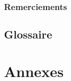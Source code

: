\documentclass{main}
\begin{document}
\makeatletter
\patchcmd{\ttlh@hang}{\parindent\z@}{\parindent\z@\leavevmode}{}{}
\patchcmd{\ttlh@hang}{\noindent}{}{}{}
\makeatother



\renewcommand{\baselinestretch}{1.0}\normalsize
\newcommand{\itab}[1]{\hspace{0em}\rlap{#1}}
\newcommand{\tab}[1]{\hspace{.2\textwidth}\rlap{#1}}
\renewcommand{\bibname}{Bibliographie} %


\cleardoublepage


\section*{Remerciements} %

\cleardoublepage

\renewcommand{\baselinestretch}{0.5}\normalsize
\tableofcontents
\renewcommand{\baselinestretch}{1.0}\normalsize
\cleardoublepage

\setcounter{page}{1}










\cleardoublepage

\chapter*{Glossaire}
\printglossaries %

\listoffigures




\appendix %

\part*{Annexes} %

%
\end{document}
